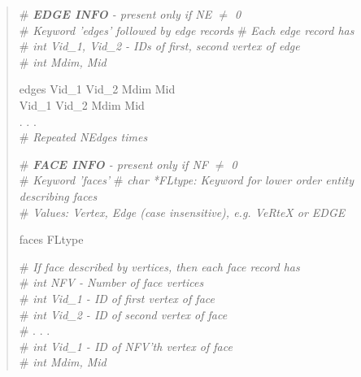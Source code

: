 \documentclass[12pt]{article}
\begin{document}
\begin{verse}
\# {\em {\bf EDGE INFO} - present only if NE $\ne$ 0} \\
\# {\em Keyword 'edges' followed by edge records}
\# {\em Each edge record has} \\
\# {\em {\em int} Vid\_1, Vid\_2  - IDs of first, second vertex of edge} \\
\# {\em {\em int} Mdim, Mid}
\vspace{1ex}

edges
Vid\_1 \hspace{0.5ex} Vid\_2 \hspace{0.5ex} Mdim \hspace{0.5ex} Mid \\
Vid\_1 \hspace{0.5ex} Vid\_2 \hspace{0.5ex} Mdim \hspace{0.5ex} Mid \\
. . . \\
\# {\em Repeated NEdges times}
\vspace{2ex}

\newpage
\# {\em {\bf FACE INFO} - present only if NF $\ne$ 0} \\
\# {\em Keyword 'faces'}
\# {\em char *FLtype: Keyword for lower order entity describing faces} \\
\# {\em Values: Vertex, Edge (case insensitive), e.g. VeRteX or EDGE} \\
\vspace{1ex}

faces FLtype 
\vspace{1ex}

\# {\em If face described by vertices, then each face record has} \\
\# {\em {\em int} NFV - Number of face vertices} \\
\# {\em {\em int} Vid\_1 - ID of first vertex of face} \\
\# {\em {\em int} Vid\_2 - ID of second vertex of face} \\
\# . . . \\
\# {\em {\em int} Vid\_1 - ID of NFV'th vertex of face} \\
\# {\em {\em int} Mdim, Mid} 
\vspace{1ex}


\end{verse}
\end{document}
